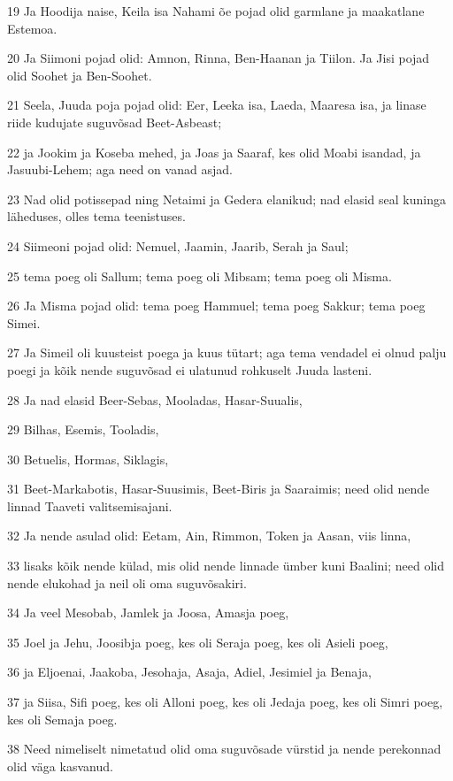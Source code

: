 \par 19 Ja Hoodija naise, Keila isa Nahami õe pojad olid garmlane ja maakatlane Estemoa.
\par 20 Ja Siimoni pojad olid: Amnon, Rinna, Ben-Haanan ja Tiilon. Ja Jisi pojad olid Soohet ja Ben-Soohet.
\par 21 Seela, Juuda poja pojad olid: Eer, Leeka isa, Laeda, Maaresa isa, ja linase riide kudujate suguvõsad Beet-Asbeast;
\par 22 ja Jookim ja Koseba mehed, ja Joas ja Saaraf, kes olid Moabi isandad, ja Jasuubi-Lehem; aga need on vanad asjad.
\par 23 Nad olid potissepad ning Netaimi ja Gedera elanikud; nad elasid seal kuninga läheduses, olles tema teenistuses.
\par 24 Siimeoni pojad olid: Nemuel, Jaamin, Jaarib, Serah ja Saul;
\par 25 tema poeg oli Sallum; tema poeg oli Mibsam; tema poeg oli Misma.
\par 26 Ja Misma pojad olid: tema poeg Hammuel; tema poeg Sakkur; tema poeg Simei.
\par 27 Ja Simeil oli kuusteist poega ja kuus tütart; aga tema vendadel ei olnud palju poegi ja kõik nende suguvõsad ei ulatunud rohkuselt Juuda lasteni.
\par 28 Ja nad elasid Beer-Sebas, Mooladas, Hasar-Suualis,
\par 29 Bilhas, Esemis, Tooladis,
\par 30 Betuelis, Hormas, Siklagis,
\par 31 Beet-Markabotis, Hasar-Suusimis, Beet-Biris ja Saaraimis; need olid nende linnad Taaveti valitsemisajani.
\par 32 Ja nende asulad olid: Eetam, Ain, Rimmon, Token ja Aasan, viis linna,
\par 33 lisaks kõik nende külad, mis olid nende linnade ümber kuni Baalini; need olid nende elukohad ja neil oli oma suguvõsakiri.
\par 34 Ja veel Mesobab, Jamlek ja Joosa, Amasja poeg,
\par 35 Joel ja Jehu, Joosibja poeg, kes oli Seraja poeg, kes oli Asieli poeg,
\par 36 ja Eljoenai, Jaakoba, Jesohaja, Asaja, Adiel, Jesimiel ja Benaja,
\par 37 ja Siisa, Sifi poeg, kes oli Alloni poeg, kes oli Jedaja poeg, kes oli Simri poeg, kes oli Semaja poeg.
\par 38 Need nimeliselt nimetatud olid oma suguvõsade vürstid ja nende perekonnad olid väga kasvanud.
